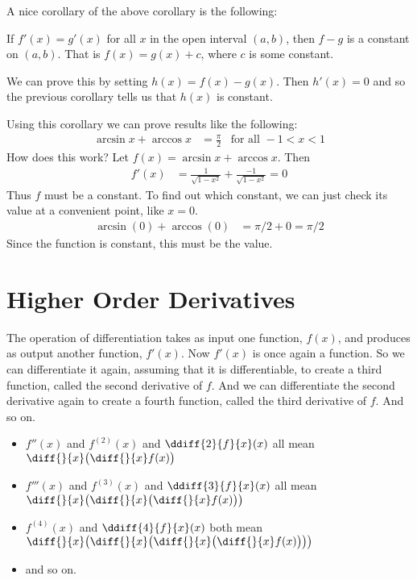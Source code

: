 A nice corollary of the above corollary is the following:
\begin{cor}\label{cor equal diff}
If $f'(x) = g'(x)$ for all $x$ in the open interval $(a,b)$, then $f-g$ is a constant on
$(a,b)$. That is $f(x)=g(x)+c$, where $c$ is some constant.
\end{cor}
We can prove this by setting $h(x)=f(x)-g(x)$. Then $h'(x)=0$ and so the previous
corollary tells us that $h(x)$ is constant.

\begin{eg}\label{eg_2_13_5}
Using this corollary we can prove results like the following:
\begin{align*}
  \arcsin x + \arccos x &= \frac{\pi}{2} & \mbox{for all } -1 < x < 1
\end{align*}
How does this work? Let $f(x) = \arcsin x + \arccos x$. Then
\begin{align*}
  f'(x) &= \frac{1}{\sqrt{1-x^2}} + \frac{-1}{\sqrt{1-x^2}} = 0
\end{align*}
Thus $f$ must be a constant. To find out which constant, we can just check its value at a
convenient point, like $x=0$.
\begin{align*}
  \arcsin(0) + \arccos(0) &= \pi/2 + 0 = \pi/2
\end{align*}
Since the function is constant, this must be the value.
\end{eg}


\section{Higher Order Derivatives}\label{sec higher diff}

The operation of differentiation takes as input one function,
$f(x)$, and produces as output another function, $f'(x)$. Now $f'(x)$ is
once again a function. So we can differentiate it again, assuming that
it is differentiable, to create a third function, called the second
derivative of $f$. And we can differentiate the second derivative again
to create a fourth function, called the third derivative of $f$.
And so on.
\begin{notn}\label{not:higherOrdDeriv}
\begin{itemize}
\item $f''(x)$ and $f^{(2)}(x)$  and $\ddiff{2}{f}{x}(x)$ all mean
$\diff{}{x}\big(\diff{}{x}f(x)\big)$
\item $f'''(x)$ and $f^{(3)}(x)$  and $\ddiff{3}{f}{x}(x)$ all mean
$\diff{}{x}\big(\diff{}{x}\big(\diff{}{x}f(x)\big)\big)$
\item $f^{(4)}(x)$  and $\ddiff{4}{f}{x}(x)$ both mean
$\diff{}{x}\big(\diff{}{x}\big(\diff{}{x}\big(\diff{}{x}f(x)\big)\big)\big)$
\item and so on.
\end{itemize}
\end{notn}

